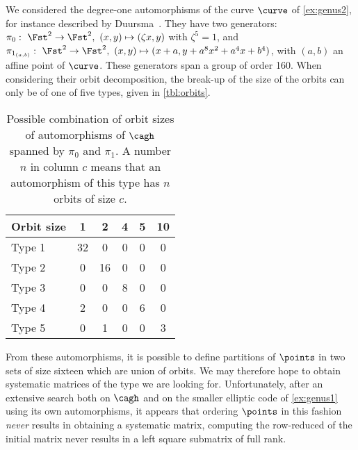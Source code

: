 We considered the degree-one automorphisms of the curve $\curve$ of \autoref{ex:genus2}, for instance described
by Duursma~\cite{duursma}. They have two generators: $\pi_0:~\Fst^2 \rightarrow \Fst^2,~(x, y) \mapsto (\zeta x, y)$ with $\zeta^5 = 1$, and
$\pi_{1_{(a,b)}}:~\Fst^2 \rightarrow \Fst^2,~(x, y) \mapsto (x + a, y + a^8 x^2 + a^4 x + b^4)$, with $(a, b)$ an affine point of $\curve$.
These generators span a group of order 160.
When considering their orbit decomposition, the break-up of the size of the orbits can only be of one of five types, given
in \autoref{tbl:orbits}.

\begin{table}[!h]
\caption[Possible combination of orbit sizes of automorphisms of $\cagh$ spanned by $\pi_0$ and $\pi_1$.]{Possible combination of orbit sizes of automorphisms of $\cagh$ spanned by $\pi_0$ and $\pi_1$.
A number $n$ in column $c$ means that an automorphism of this type has $n$ orbits of size $c$.
\label{tbl:orbits}}
\begin{center}
\begin{tabular}{ l  c  c  c  c  c}
\toprule
 Orbit size & 1 & 2 & 4 & 5 & 10 \\
\midrule
Type 1 & 32 & 0 & 0 & 0 & 0\\

Type 2 & 0 & 16 & 0 & 0 & 0\\

Type 3 & 0 & 0 & 8 & 0 & 0\\

Type 4 & 2 & 0 & 0 & 6 & 0\\

Type 5 & 0 & 1 & 0 & 0 & 3\\
\bottomrule
\end{tabular}
\end{center}
\end{table}
\noindent
From these automorphisms, it is possible to define partitions of $\points$ in two sets of size sixteen which are union of orbits. We may therefore
hope to obtain systematic matrices of the type we are looking for. Unfortunately, after an extensive search both on $\cagh$ and
on the smaller elliptic code of \autoref{ex:genus1} using its own automorphisms, it appears that ordering $\points$ in this fashion \emph{never} results in
obtaining a systematic matrix, \ie computing the row-reduced of the initial matrix never results in a left square submatrix of full rank.

